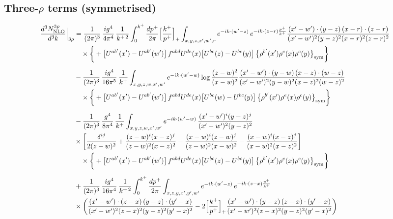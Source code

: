 \documentclass[10pt]{article}
\numberwithin{equation}{section}
\begin{document}
\subsection{Three-$\rho$ terms (symmetrised)}
\begin{align}
\frac{d^{3}N^{3\rho}_{\rm NLO}}{d^{3}k}\Big|_{3\rho}&=\frac{1}{(2\pi)^{3}}\,\frac{ig^{4}}{4\pi^{4}}\,\frac{1}{k^{+\,2}}\int_{0}^{k^{+}}\frac{dp^{+}}{2\pi}\Big[\frac{k^{+}}{p^{+}}\Big]_{+}\int_{x,y,z,x^{\prime},w^{\prime},r}e^{-ik\cdot(w^{\prime}-z)}\,e^{-ik\cdot(z-r)\frac{p^{+}}{k^{+}}}\frac{(x^{\prime}-w^{\prime})\cdot(y-z)\,(x-r)\cdot(z-r)}{(x^{\prime}-w^{\prime})^{2}(y-z)^{2}(x-r)^{2}(z-r)^{2}}\notag\\
&\quad\times\bigg\{+\big[U^{ab^{\prime}}(x^{\prime})-U^{ab^{\prime}}(w^{\prime})\big]\,f^{abd}U^{de}(x)\big[U^{bc}(z)-U^{bc}(y)\big]\,\big\{\rho^{b^{\prime}}(x^{\prime})\rho^{e}(x)\rho^{c}(y)\big\}_{\rm sym}\bigg\}\notag\\[6pt]
&-\frac{1}{(2\pi)^{3}}\,\frac{ig^{4}}{16\pi^{5}}\,\frac{1}{k^{+}}\int_{x,y,z,w,x^{\prime},w^{\prime}}e^{-ik\cdot(w^{\prime}-w)}\log\frac{(z-w)^{2}}{(x-w)^{2}}\frac{(x^{\prime}-w^{\prime})\cdot(y-w)\,(x-z)\cdot(w-z)}{(x^{\prime}-w^{\prime})^{2}(y-w)^{2}(x-z)^{2}(w-z)^{2}}\notag\\
&\quad\times\bigg\{+\big[U^{ab^{\prime}}(x^{\prime})-U^{ab^{\prime}}(w^{\prime})\big]\,f^{abd}U^{de}(x)\big[U^{bc}(w)-U^{bc}(y)\big]\,\big\{\rho^{b^{\prime}}(x^{\prime})\rho^{e}(x)\rho^{c}(y)\big\}_{\rm sym}\bigg\}\notag\\[6pt]
&-\frac{1}{(2\pi)^{3}}\,\frac{g^{4}}{8\pi^{4}}\,\frac{1}{k^{+}}\int_{x,y,z,w,x^{\prime},w^{\prime}}e^{-ik\cdot(w^{\prime}-w)}\,\frac{(x^{\prime}-w^{\prime})^{i}(y-z)^{j}}{(x^{\prime}-w^{\prime})^{2}(y-z)^{2}}\notag\\
&\times\bigg[\frac{\delta^{ij}}{2(z-w)^{2}}+\frac{(z-w)^{i}(x-z)^{j}}{(z-w)^{2}(x-z)^{2}}-\frac{(x-w)^{i}(z-w)^{j}}{(z-w)^{2}(x-w)^{2}}-\frac{(x-w)^{i}(x-z)^{j}}{(x-w)^{2}(x-z)^{2}}\bigg]\notag\\
&\quad\times\bigg\{+\big[U^{ab^{\prime}}(x^{\prime})-U^{ab^{\prime}}(w^{\prime})\big]\,f^{abd}U^{de}(x)\big[U^{bc}(z)-U^{bc}(y)\big]\,\big\{\rho^{b^{\prime}}(x^{\prime})\rho^{e}(x)\rho^{c}(y)\big\}_{\rm sym}\bigg\}\notag\\[6pt]
&+\frac{1}{(2\pi)^{3}}\,\frac{ig^{4}}{16\pi^{4}}\,\frac{1}{k^{+\,2}}\int_{0}^{k^{+}}\frac{dp^{+}}{2\pi}\int_{x,z,y,x^{\prime},y^{\prime},w^{\prime}}e^{-ik\cdot(w^{\prime}-z)}\,e^{-ik\cdot(z-x)\frac{p^{+}}{k^{+}}}\notag\\
&\times\bigg(\frac{(x^{\prime}-w^{\prime})\cdot(z-x)\,(y-z)\cdot(y^{\prime}-x)}{(x^{\prime}-w^{\prime})^{2}(z-x)^{2}(y-z)^{2}(y^{\prime}-x)^{2}}-2\Big[\frac{k^{+}}{p^{+}}\Big]_{+}\frac{(x^{\prime}-w^{\prime})\cdot(y-z)\,(z-x)\cdot(y^{\prime}-x)}{(x^{\prime}-w^{\prime})^{2}(z-x)^{2}(y-z)^{2}(y^{\prime}-x)^{2}}\bigg)\notag\\

\end{align}
\end{document}

